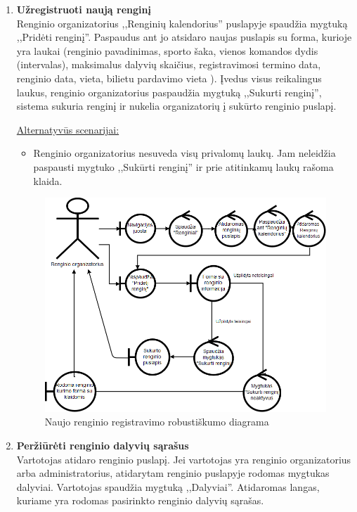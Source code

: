 \documentclass{VUMIFPSkursinis}
\begin{document}
\begin{enumerate} [label = \textbf{U\arabic*.}]
			\item \textbf{Užregistruoti naują renginį}   \\
					Renginio organizatorius ,,Renginių kalendorius'' puslapyje spaudžia mygtuką ,,Pridėti renginį''. Paspaudus ant jo atsidaro naujas puslapis su forma, kurioje yra laukai (renginio pavadinimas, sporto šaka, vienos komandos dydis (intervalas), maksimalus dalyvių skaičius, registravimosi termino data, renginio data, vieta, bilietu pardavimo vieta ). Įvedus visus reikalingus laukus, renginio organizatorius paspaudžia mygtuką ,,Sukurti renginį'', sistema sukuria renginį ir nukelia organizatorių į sukūrto renginio puslapį.
						
					\underline{Alternatyvūs scenarijai:}
					\begin{itemize}
						\item Renginio organizatorius nesuveda visų privalomų laukų. Jam neleidžia paspausti mygtuko ,,Sukūrti renginį'' ir prie atitinkamų laukų rašoma klaida.
					\end{itemize}

					\begin{figure}[H]
						\centering
						\includegraphics[width=\textwidth]{img/PSI5/u32.png}
						\caption{Naujo renginio registravimo robustiškumo diagrama}
						\label{draw:u32}
					\end{figure}
			
			\item \textbf{Peržiūrėti renginio dalyvių sąrašus}   \\
					Vartotojas atidaro renginio puslapį. Jei vartotojas yra renginio organizatorius arba administratorius, atidarytam renginio puslapyje rodomas mygtukas dalyviai. Vartotojas spaudžia mygtuką ,,Dalyviai''. Atidaromas langas, kuriame yra rodomas pasirinkto renginio dalyvių sąrašas.
					

\end{enumerate}
\end{document}
